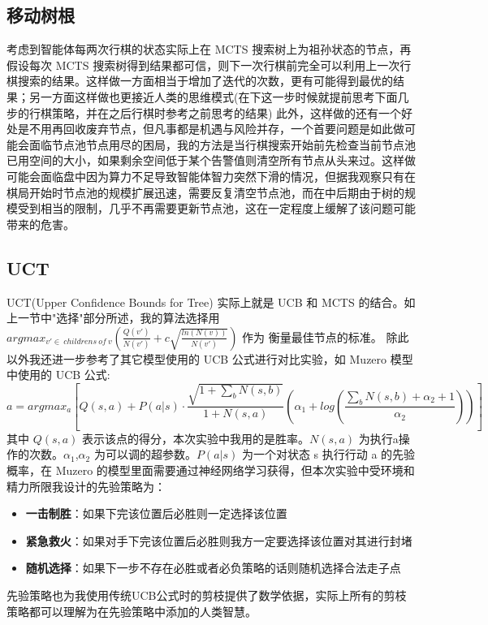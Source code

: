 \documentclass{article}
\begin{document}
\begin{spacing}{1.1}
	\subsection{移动树根}
	\hspace{1.4em}
	考虑到智能体每两次行棋的状态实际上在 MCTS 搜索树上为祖孙状态的节点，再假设每次 MCTS 搜索树得到结果都可信，则下一次行棋前完全可以利用上一次行棋搜索的结果。这样做一方面相当于增加了迭代的次数，更有可能得到最优的结果；另一方面这样做也更接近人类的思维模式(在下这一步时候就提前思考下面几步的行棋策略，并在之后行棋时参考之前思考的结果)
	此外，这样做的还有一个好处是不用再回收废弃节点，但凡事都是机遇与风险并存，一个首要问题是如此做可能会面临节点池节点用尽的困局，我的方法是当行棋搜索开始前先检查当前节点池已用空间的大小，如果剩余空间低于某个告警值则清空所有节点从头来过。这样做可能会面临盘中因为算力不足导致智能体智力突然下滑的情况，但据我观察只有在棋局开始时节点池的规模扩展迅速，需要反复清空节点池，而在中后期由于树的规模受到相当的限制，几乎不再需要更新节点池，这在一定程度上缓解了该问题可能带来的危害。
	
	\subsection{UCT}
	\hspace{1.4em}
	UCT(Upper Confidence Bounds for Tree) 实际上就是 UCB 和 MCTS 的结合。如上一节中"选择"部分所述，我的算法选择用 $argmax_{v'\in\ childrens\ of\ v} (\frac{Q(v')}{N(v')}+c\sqrt{\frac{ln(N(v))}{N(v')}})$ 作为
	衡量最佳节点的标准。
	除此以外我还进一步参考了其它模型使用的 UCB 公式进行对比实验，如 Muzero 模型中使用的 UCB 公式:
	$$
	a = argmax_a[Q(s,a)+P(a|s)\cdot \frac{\sqrt{1+\sum_b{N(s,b)}}}{1+N(s,a)}(\alpha_1+log(\frac{\sum_b{N(s,b)+\alpha_2+1}}{\alpha_2}))]
	$$
	其中 $Q(s,a)$ 表示该点的得分，本次实验中我用的是胜率。$N(s,a)$ 为执行a操作的次数。$\alpha_1$,$\alpha_2$ 为可以调的超参数。$P(a|s)$ 为一个对状态 s 执行行动 a 的先验概率，在 Muzero 的模型里面需要通过神经网络学习获得，但本次实验中受环境和精力所限我设计的先验策略为：
	\begin{itemize}
		\item \textbf{一击制胜}：如果下完该位置后必胜则一定选择该位置
		\item \textbf{紧急救火}：如果对手下完该位置后必胜则我方一定要选择该位置对其进行封堵
		\item \textbf{随机选择}：如果下一步不存在必胜或者必负策略的话则随机选择合法走子点
	\end{itemize}
	先验策略也为我使用传统UCB公式时的剪枝提供了数学依据，实际上所有的剪枝策略都可以理解为在先验策略中添加的人类智慧。
	

\end{spacing}
\end{document}
